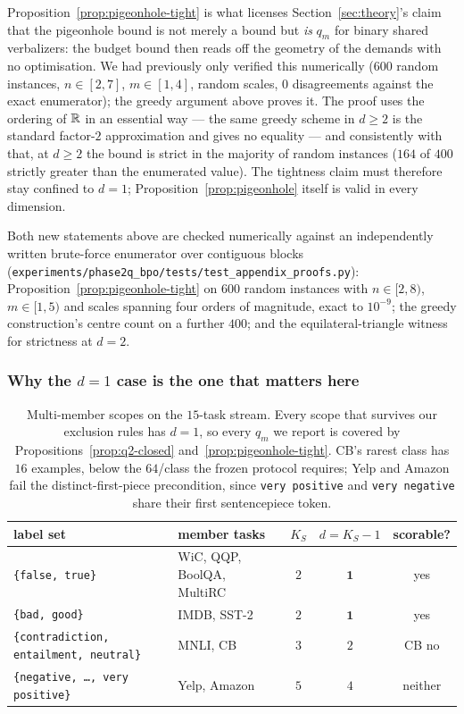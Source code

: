 \noindent Proposition~\ref{prop:pigeonhole-tight} is what licenses
Section~\ref{sec:theory}'s claim that the pigeonhole bound is not merely a bound but
\emph{is} $q_m$ for binary shared verbalizers: the budget bound then reads off the
geometry of the demands with no optimisation. We had previously only verified this
numerically ($600$ random instances, $n\in[2,7]$, $m\in[1,4]$, random scales, $0$
disagreements against the exact enumerator); the greedy argument above proves it.
The proof uses the ordering of $\mathbb{R}$ in an essential way --- the same greedy scheme in
$d\ge2$ is the standard factor-$2$ approximation and gives no equality --- and
consistently with that, at $d\ge2$ the bound is strict in the majority of random
instances ($164$ of $400$ strictly greater than the enumerated value). The
tightness claim must therefore stay confined to $d=1$;
Proposition~\ref{prop:pigeonhole} itself is valid in every dimension.

Both new statements above are checked numerically against an independently written
brute-force enumerator over contiguous blocks
(\texttt{experiments/phase2q\_bpo/tests/test\_appendix\_proofs.py}):
Proposition~\ref{prop:pigeonhole-tight} on $600$ random instances with
$n\in[2,8)$, $m\in[1,5)$ and scales spanning four orders of magnitude, exact to
$10^{-9}$; the greedy construction's centre count on a further $400$; and the
equilateral-triangle witness for strictness at $d=2$.

\subsubsection{Why the \texorpdfstring{$d=1$}{d=1} case is the one that matters here}

\begin{table}[t]
\centering
\small
\begin{tabular}{llcc c}
\toprule
label set & member tasks & $K_S$ & $d=K_S-1$ & scorable? \\
\midrule
\texttt{\{false, true\}} & WiC, QQP, BoolQA, MultiRC & $2$ & $\mathbf{1}$ & yes \\
\texttt{\{bad, good\}} & IMDB, SST-2 & $2$ & $\mathbf{1}$ & yes \\
\texttt{\{contradiction, entailment, neutral\}} & MNLI, CB & $3$ & $2$ & CB no \\
\texttt{\{negative, \dots, very positive\}} & Yelp, Amazon & $5$ & $4$ & neither \\
\bottomrule
\end{tabular}
\caption{Multi-member scopes on the $15$-task stream. Every scope that survives our
exclusion rules has $d=1$, so every $q_m$ we report is covered by
Propositions~\ref{prop:q2-closed} and~\ref{prop:pigeonhole-tight}. CB's rarest class
has $16$ examples, below the $64$/class the frozen protocol requires; Yelp and Amazon
fail the distinct-first-piece precondition, since \texttt{very positive} and
\texttt{very negative} share their first sentencepiece token.}
\label{tab:scope-dims}
\end{table}

